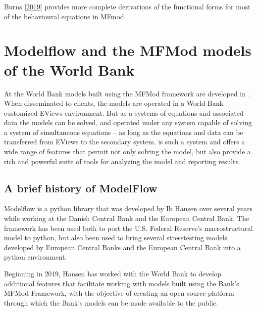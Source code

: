 \documentclass[letterpaper,10pt,english]{jupyterBook}
\begin{document}
\sphinxAtStartPar
Burns  {[}\hyperlink{cite.content/99_BackMatter/References:id15}{2019}{]} provides more complete derivations of the functional forms for most of the behavioural equations in MFmod.

\sphinxstepscope


\section{Modelflow and the MFMod models of the World Bank}
\label{\detokenize{content/02_MacrostructuralModels/MFModAndModelFlow:modelflow-and-the-mfmod-models-of-the-world-bank}}\label{\detokenize{content/02_MacrostructuralModels/MFModAndModelFlow::doc}}
\sphinxAtStartPar
At the World Bank models built using the MFMod framework are developed in . When disseminated to clients, the models are operated in a World Bank customized EViews environment. But as a systems of equations and associated data the models can be solved, and operated under any system capable of solving a system of simultaneous equations – as long as the equations and data can be transferred from EViews to the secondary system.  is such a system and offers a wide range of features that permit not only solving the model, but also provide a rich and powerful suite of tools for analyzing the model and reporting results.


\subsection{A brief history of ModelFlow}
\label{\detokenize{content/02_MacrostructuralModels/MFModAndModelFlow:a-brief-history-of-modelflow}}
\sphinxAtStartPar
Modelflow is a python library that was developed by Ib Hansen over several years while working at the Danish Central Bank and the European Central Bank. The framework has been used both to port the U.S. Federal Reserve’s macro\sphinxhyphen{}structural  model to python, but also been used to bring several stress\sphinxhyphen{}testing models developed by European Central Banks and the European Central Bank into a python environment.

\sphinxAtStartPar
Beginning in 2019, Hansen has worked with the World Bank to develop additional features that facilitate working with models built using the Bank’s MFMod Framework, with the objective of creating an open source platform through which the Bank’s models can be made available to the public.
\end{document}

